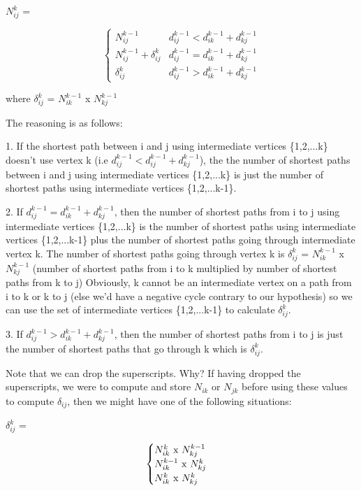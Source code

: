 \documentclass[11pt,a4paper]{article}
\begin{document}
$N_{ij}^{k}$ = 

\[ \begin{cases} 
      N_{ij}^{k-1} & d_{ij}^{k-1} < d_{ik}^{k-1} + d_{kj}^{k-1} \\
      N_{ij}^{k-1} + \delta_{ij}^{k} & d_{ij}^{k-1} = d_{ik}^{k-1} + d_{kj}^{k-1} \\
      \delta_{ij}^{k} & d_{ij}^{k-1} > d_{ik}^{k-1} + d_{kj}^{k-1}
   \end{cases}
\]

where $\delta_{ij}^{k}$ = $N_{ik}^{k-1}$ x $N_{kj}^{k-1}$

The reasoning is as follows:

1. If the shortest path between i and j using intermediate vertices \{1,2,...k\} doesn't use vertex k (i.e $d_{ij}^{k-1} < d_{ij}^{k-1} + d_{kj}^{k-1}$), the the number of shortest paths between i and j using intermediate vertices \{1,2,...k\} is just the number of shortest paths using intermediate vertices \{1,2,...k-1\}. 

2. If $d_{ij}^{k-1} = d_{ik}^{k-1} + d_{kj}^{k-1}$, then the number of shortest paths from i to j using intermediate vertices \{1,2,...k\} is the number of shortest paths using intermediate vertices \{1,2,...k-1\} plus the number of shortest paths going through intermediate vertex k. The number of shortest paths going through vertex k is $\delta_{ij}^{k}$ = $N_{ik}^{k-1}$ x $N_{kj}^{k-1}$ (number of shortest paths from i to k multiplied by number of shortest paths from k to j) Obviously, k cannot be an intermediate vertex on a path from i to k or k to j (else we'd have a negative cycle contrary to our hypothesis) so we can use the set of intermediate vertices \{1,2,...k-1\} to calculate $\delta_{ij}^{k}$.

3. If $d_{ij}^{k-1} > d_{ik}^{k-1} + d_{kj}^{k-1}$, then the number of shortest paths from i to j is just the number of shortest paths that go through k which is $\delta_{ij}^{k}$.

Note that we can drop the superscripts. Why? If having dropped the superscripts, we were to compute and store $N_{ik}$ or $N_{jk}$ before using these values to compute $\delta_{ij}$, then we might have one of the following situations:

$\delta_{ij}^{k}$ = 

\[ \begin{cases} 
      N_{ik}^{k}$ x $N_{kj}^{k-1} &  \\
      N_{ik}^{k-1}$ x $N_{kj}^{k} &  \\
      N_{ik}^{k}$ x $N_{kj}^{k} & 
   \end{cases}
\]
\end{document}
